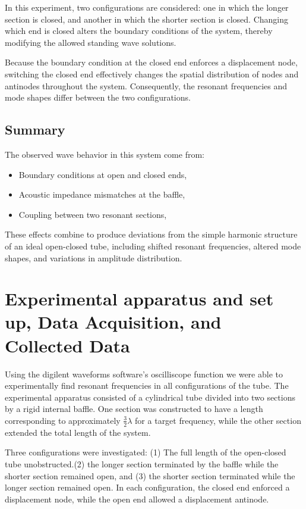 \documentclass[journal, a4paper]{IEEEtran}
\begin{document}
In this experiment, two configurations are considered: one in which the longer section is closed, and another in which the shorter section is closed. Changing which end is closed alters the boundary conditions of the system, thereby modifying the allowed standing wave solutions.

Because the boundary condition at the closed end enforces a displacement node, switching the closed end effectively changes the spatial distribution of nodes and antinodes throughout the system. Consequently, the resonant frequencies and mode shapes differ between the two configurations.

\subsection{Summary}

The observed wave behavior in this system come from:
\begin{itemize}
    \item Boundary conditions at open and closed ends,
    \item Acoustic impedance mismatches at the baffle,
    \item Coupling between two resonant sections,
\end{itemize}

These effects combine to produce deviations from the simple harmonic structure of an ideal open-closed tube, including shifted resonant frequencies, altered mode shapes, and variations in amplitude distribution.
\section{Experimental apparatus and set up, Data Acquisition, and Collected Data}
Using the digilent waveforms software's oscilliscope function we were able to experimentally find resonant frequencies in all configurations of the tube. The experimental apparatus consisted of a cylindrical tube divided into two sections by a rigid internal baffle. One section was constructed to have a length corresponding to approximately $\frac{3}{2}\lambda$ for a target frequency, while the other section extended the total length of the system.

Three configurations were investigated: (1) The full length of the open-closed tube unobstructed.(2) the longer section terminated by the baffle while the shorter section remained open, and (3) the shorter section terminated while the longer section remained open. In each configuration, the closed end enforced a displacement node, while the open end allowed a displacement antinode.
\end{document}
